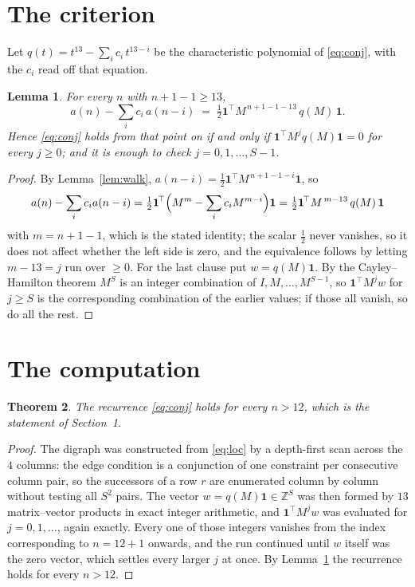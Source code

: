 \documentclass[11pt,a4paper]{article}
\theoremstyle{plain}
\newtheorem{theorem}{Theorem}
\newtheorem{lemma}[theorem]{Lemma}
\theoremstyle{definition}
\begin{document}
\section{The criterion}

Let $q(t)=t^{13}-\sum_i c_i\,t^{13-i}$ be the characteristic polynomial of
\eqref{eq:conj}, with the $c_i$ read off that equation.

\begin{lemma}\label{lem:crit}
For every $n$ with $n+1-1\ge13$,
\[
a(n)-\sum_i c_i\,a(n-i)\;=\;\tfrac1{2}\mathbf{1}^{\!\top}M^{\,n+1-1-13}\,q(M)\,\mathbf{1} .
\]
Hence \eqref{eq:conj} holds from that point on if and only if
$\mathbf{1}^{\!\top}M^{j}q(M)\mathbf{1}=0$ for every $j\ge0$; and it is enough to check
$j=0,1,\dots,S-1$.
\end{lemma}

\begin{proof}
By Lemma~\ref{lem:walk}, $a(n-i)=\tfrac1{2}\mathbf{1}^{\!\top}M^{\,n+1-1-i}\mathbf{1}$, so
\[
a(n)-\sum_i c_i a(n-i)
=\tfrac1{2}\mathbf{1}^{\!\top}\Bigl(M^{m}-\sum_i c_i M^{m-i}\Bigr)\mathbf{1}
=\tfrac1{2}\mathbf{1}^{\!\top}M^{\,m-13}\,q(M)\,\mathbf{1}
\]
with $m=n+1-1$, which is the stated identity; the scalar $\tfrac1{2}$ never vanishes, so it does not affect whether the left side is zero, and the equivalence follows by letting
$m-13=j$ run over $\ge0$. For the last clause put $w=q(M)\mathbf{1}$. By the
Cayley--Hamilton theorem $M^{S}$ is an integer combination of $I,M,\dots,M^{S-1}$, so
$\mathbf{1}^{\!\top}M^{j}w$ for $j\ge S$ is the corresponding combination of the earlier
values; if those all vanish, so do all the rest.
\end{proof}

\section{The computation}

\begin{theorem}
The recurrence \eqref{eq:conj} holds for every $n>12$, which is the statement of
Section~1.
\end{theorem}

\begin{proof}
The digraph was constructed from \eqref{eq:loc} by a depth-first scan across the $4$
columns: the edge condition is a conjunction of one constraint per consecutive column
pair, so the successors of a row $r$ are enumerated column by column without testing all
$S^2$ pairs. The vector $w=q(M)\mathbf{1}\in\mathbb{Z}^{S}$ was then formed by $13$
matrix--vector products in exact integer arithmetic, and $\mathbf{1}^{\!\top}M^{j}w$ was
evaluated for $j=0,1,\dots$, again exactly. Every one of those integers vanishes from the
index corresponding to $n=12+1$ onwards, and the run continued until $w$ itself was the
zero vector, which settles every larger $j$ at once. By Lemma~\ref{lem:crit} the recurrence
holds for every $n>12$.
\end{proof}
\end{document}
